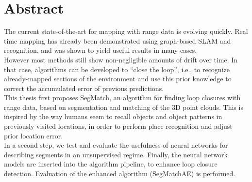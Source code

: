 \chapter*{Abstract}

The current state-of-the-art for mapping with range data is evolving quickly. Real time mapping has already been demonstrated using graph-based SLAM and recognition, and was shown to yield useful results in many cases.\\

However most methods still show non-negligible amounts of drift over time. In that case, algorithms can be developed to “close the loop”, i.e., to recognize already-mapped sections of the environment and use this prior knowledge to correct the accumulated error of previous predictions.\\

This thesis first proposes SegMatch, an algorithm for finding loop closures with range data, based on segmentation and matching of the 3D point clouds. This is inspired by the way humans seem to recall objects and object patterns in previously visited locations, in order to perform place recognition and adjust prior location error.\\

In a second step, we test and evaluate the usefulness of neural networks for describing segments in an unsupervised regime. Finally, the neural network models are inserted into the algorithm pipeline, to enhance loop closure detection. Evaluation of the enhanced algorithm (SegMatchAE) is performed.\\
